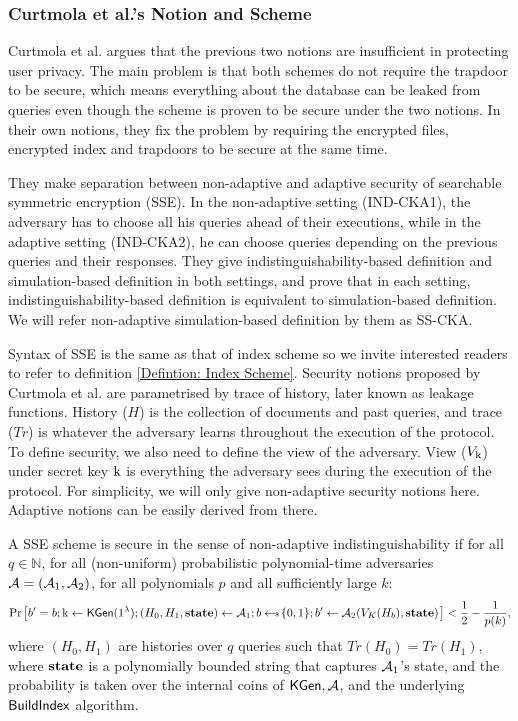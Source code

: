 \subsubsection{Curtmola et al.'s Notion and Scheme}
Curtmola et al. \cite{CCS:CGKO06} argues that the previous two notions are insufficient in protecting user privacy. The main problem is that both schemes do not require the trapdoor to be secure, which means everything about the database can be leaked from queries even though the scheme is proven to be secure under the two notions. In their own notions, they fix the problem by requiring the encrypted files, encrypted index and trapdoors to be secure at the same time.

They make separation between non-adaptive and adaptive security of searchable symmetric encryption (SSE). In the non-adaptive setting (IND-CKA1), the adversary has to choose all his queries ahead of their executions, while in the adaptive setting (IND-CKA2), he can choose queries depending on the previous queries and their responses. They give indistinguishability-based definition and simulation-based definition in both settings, and prove that in each setting, indistinguishability-based definition is equivalent to simulation-based definition. We will refer non-adaptive simulation-based definition by them as SS-CKA.

Syntax of SSE is the same as that of index scheme so we invite interested readers to refer to definition \ref{Defintion: Index Scheme}. Security notions proposed by Curtmola et al. are parametrised by trace of history, later known as leakage functions. History ($H$) is the collection of documents and past queries, and trace ($Tr$) is whatever the adversary learns throughout the execution of the protocol. To define security, we also need to define the view of the adversary. View ($V_{\text{k}}$) under secret key $\text{k}$ is everything the adversary sees during the execution of the protocol. For simplicity, we will only give non-adaptive security notions here. Adaptive notions can be easily derived from there.

\begin{definition}
	\normalfont
	A SSE scheme is secure in the sense of non-adaptive indistinguishability if for all $q \in \mathbb{N}$, for all (non-uniform) probabilistic polynomial-time adversaries $\mathcal{A} = (\mathcal{A}_1, \mathcal{A}_2)$, for all polynomials $p$ and all sufficiently large $k$:
	\begin{equation*}
		\prob{b' = b; \key \gets \kgen(\secparam); (H_0, H_1, \state) \gets \adversary_1; b \sample \{0,1\}; b' \gets \adversary_2(V_K(H_b), \state)} < \frac{1}{2} - \frac{1}{p(k)},
	\end{equation*}
	where $(H_0, H_1)$ are histories over $q$ queries such that $Tr(H_0) = Tr(H_1)$, where $\textbf{state}$ is a polynomially bounded string that captures $\mathcal{A}_1$'s state, and the probability is taken over the internal coins of $\mathsf{KGen}, \mathcal{A}$, and the underlying $\textsf{BuildIndex}$ algorithm.
\end{definition}

